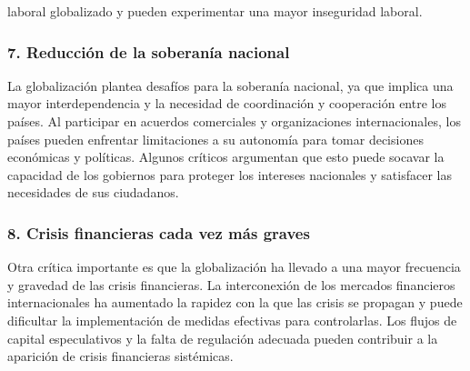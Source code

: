 \documentclass[
  letterpaper,
  DIV=11,
  numbers=noendperiod]{scrartcl}
\begin{document}
laboral globalizado y pueden experimentar una mayor inseguridad laboral.

\hypertarget{reducciuxf3n-de-la-soberanuxeda-nacional}{%
\subsubsection{7. Reducción de la soberanía
nacional}\label{reducciuxf3n-de-la-soberanuxeda-nacional}}

La globalización plantea desafíos para la soberanía nacional, ya que
implica una mayor interdependencia y la necesidad de coordinación y
cooperación entre los países. Al participar en acuerdos comerciales y
organizaciones internacionales, los países pueden enfrentar limitaciones
a su autonomía para tomar decisiones económicas y políticas. Algunos
críticos argumentan que esto puede socavar la capacidad de los gobiernos
para proteger los intereses nacionales y satisfacer las necesidades de
sus ciudadanos.

\hypertarget{crisis-financieras-cada-vez-muxe1s-graves}{%
\subsubsection{8. Crisis financieras cada vez más
graves}\label{crisis-financieras-cada-vez-muxe1s-graves}}

Otra crítica importante es que la globalización ha llevado a una mayor
frecuencia y gravedad de las crisis financieras. La interconexión de los
mercados financieros internacionales ha aumentado la rapidez con la que
las crisis se propagan y puede dificultar la implementación de medidas
efectivas para controlarlas. Los flujos de capital especulativos y la
falta de regulación adecuada pueden contribuir a la aparición de crisis
financieras sistémicas.


\printbibliography
\end{document}
